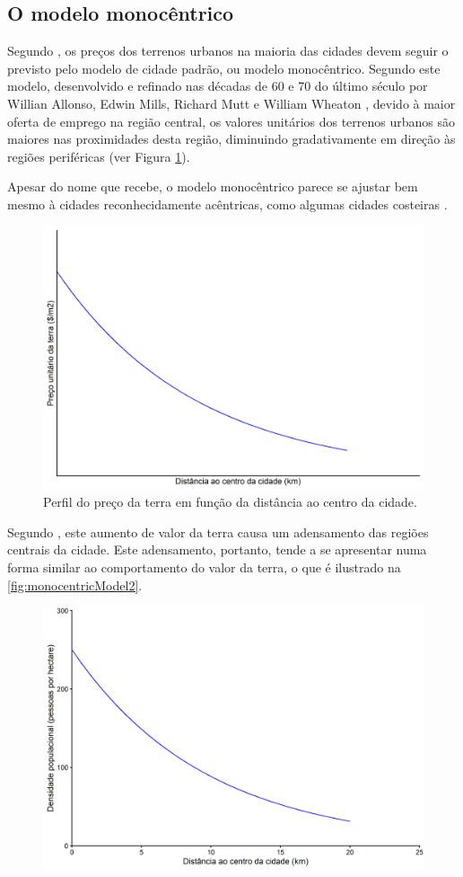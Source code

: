 \documentclass[
	12pt,				%
	oneside,			%
	a4paper,			%
	chapter=TITLE,		%
	section=TITLE,		%
	english,			%
	brazil				%
	]{abntex2}
\begin{document}
\begin{refsection}
\hypertarget{o-modelo-monocuxeantrico}{%
\section{O modelo monocêntrico}\label{o-modelo-monocuxeantrico}}

Segundo \textcite[p.~236]{bertaud}, os preços dos terrenos urbanos na maioria das cidades
devem seguir o previsto pelo modelo de cidade padrão, ou modelo monocêntrico.
Segundo este modelo, desenvolvido e refinado nas décadas de 60 e 70 do último
século por Willian Allonso, Edwin Mills, Richard Mutt e William Wheaton
\autocite[p.~94]{bertaud}, devido à maior oferta de emprego na região central, os
valores unitários dos terrenos urbanos são maiores nas proximidades desta
região, diminuindo gradativamente em direção às regiões periféricas (ver Figura
\ref{fig:monocentricModel1}).

Apesar do nome que recebe, o modelo monocêntrico parece se ajustar bem mesmo à
cidades reconhecidamente acêntricas, como algumas cidades costeiras \autocite[
p.~105]{bertaud}.
\begin{figure}[H]

{\centering \includegraphics[width=0.7\linewidth]{images/monocentricModel1-1} 

}

\caption{Perfil do preço da terra em função da distância ao centro da cidade.}\label{fig:monocentricModel1}
\end{figure}
Segundo \textcite[p.~94-98]{bertaud}, este aumento de valor da
terra causa um adensamento das regiões centrais da cidade. Este adensamento,
portanto, tende a se apresentar numa forma similar ao comportamento do valor da
terra, o que é ilustrado na \ref{fig:monocentricModel2}.
\begin{figure}[H]

{\centering \includegraphics[width=0.7\linewidth]{images/monocentricModel2-1} 

}
\end{figure}
\end{refsection}
\end{document}
